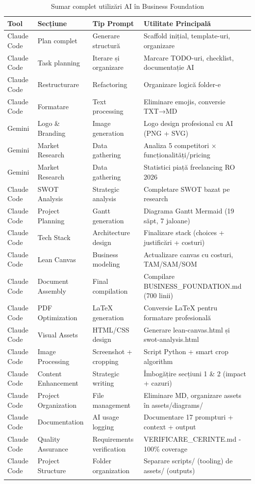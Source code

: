 \documentclass[11pt,a4paper]{article}
\begin{document}
\begin{longtable}{|p{2.5cm}|p{3cm}|p{3cm}|p{5.5cm}|}
\hline
\textbf{Tool} & \textbf{Secțiune} & \textbf{Tip Prompt} & \textbf{Utilitate Principală} \\
\hline
\endhead
Claude Code & Plan complet & Generare structură & Scaffold inițial, template-uri, organizare \\
\hline
Claude Code & Task planning & Iterare și organizare & Marcare TODO-uri, checklist, documentație AI \\
\hline
Claude Code & Restructurare & Refactoring & Organizare logică folder-e \\
\hline
Claude Code & Formatare & Text processing & Eliminare emojis, conversie TXT→MD \\
\hline
Gemini & Logo \& Branding & Image generation & Logo design profesional cu AI (PNG + SVG) \\
\hline
Gemini & Market Research & Data gathering & Analiza 5 competitori × funcționalități/pricing \\
\hline
Gemini & Market Research & Data gathering & Statistici piață freelancing RO 2026 \\
\hline
Claude Code & SWOT Analysis & Strategic analysis & Completare SWOT bazat pe research \\
\hline
Claude Code & Project Planning & Gantt generation & Diagrama Gantt Mermaid (19 săpt, 7 jaloane) \\
\hline
Claude Code & Tech Stack & Architecture design & Finalizare stack (choices + justificări + costuri) \\
\hline
Claude Code & Lean Canvas & Business modeling & Actualizare canvas cu costuri, TAM/SAM/SOM \\
\hline
Claude Code & Document Assembly & Final compilation & Compilare BUSINESS\_FOUNDATION.md (700 linii) \\
\hline
Claude Code & PDF Optimization & LaTeX generation & Conversie LaTeX pentru formatare profesională \\
\hline
Claude Code & Visual Assets & HTML/CSS design & Generare lean-canvas.html și swot-analysis.html \\
\hline
Claude Code & Image Processing & Screenshot + cropping & Script Python + smart crop algorithm \\
\hline
Claude Code & Content Enhancement & Strategic writing & Îmbogățire secțiuni 1 \& 2 (impact + cazuri) \\
\hline
Claude Code & Project Organization & File management & Eliminare MD, organizare assets în assets/diagrams/ \\
\hline
Claude Code & Documentation & AI usage logging & Documentare 17 prompturi + context + output \\
\hline
Claude Code & Quality Assurance & Requirements verification & VERIFICARE\_CERINTE.md - 100\% coverage \\
\hline
Claude Code & Project Structure & Folder organization & Separare scripts/ (tooling) de assets/ (outputs) \\
\hline
\caption{Sumar complet utilizări AI în Business Foundation}
\end{longtable}
\end{document}
